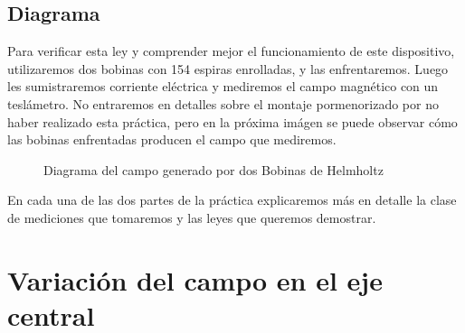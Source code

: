 \documentclass[12pt, a4paper, titlepage]{article}
\begin{document}
  \newpage
  \subsection{Diagrama}

  Para verificar esta ley y comprender mejor el funcionamiento de este dispositivo, utilizaremos dos bobinas con 154 espiras enrolladas, y las enfrentaremos. Luego les sumistraremos corriente eléctrica y mediremos el campo magnético con un teslámetro. No entraremos en detalles sobre el montaje pormenorizado por no haber realizado esta práctica, pero en la próxima imágen se puede observar cómo las bobinas enfrentadas producen el campo que mediremos.

  \begin{figure}[H]
    \centering
    \caption{Diagrama del campo generado por dos Bobinas de Helmholtz}
  \end{figure}

  En cada una de las dos partes de la práctica explicaremos más en detalle la clase de mediciones que tomaremos y las leyes que queremos demostrar.

  \newpage
  \section{Variación del campo en el eje central}
\end{document}
